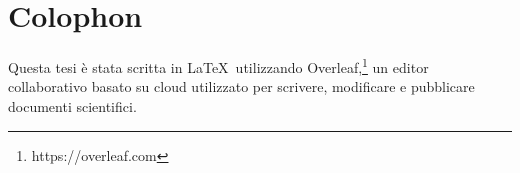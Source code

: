 \chapter*{Colophon}

Questa tesi è stata scritta in \LaTeX~utilizzando Overleaf,\footnote{https://overleaf.com} un editor collaborativo basato su cloud utilizzato per scrivere, modificare e pubblicare documenti scientifici.\\